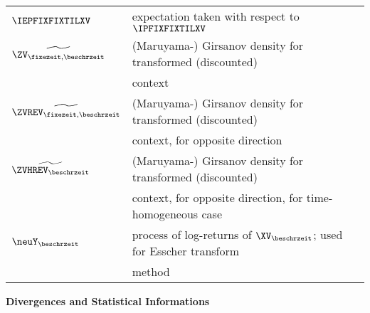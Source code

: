 \begin{longtable}{ll}
\\
\hspace{-0.33cm} $\IEPFIXFIXTILXV$ & expectation taken with respect to  $\IPFIXFIXTILXV$ 
\\
\hspace{-0.33cm} $\widetilde{\ZV_{{\fixezeit},{\beschrzeit}}}$ & (Maruyama-) Girsanov density 
 for transformed (discounted) 
\\
\hspace{-0.33cm} $\ $ & context
\\
\hspace{-0.33cm} $\widetilde{\ZVREV_{\fixezeit,\beschrzeit}}$ & (Maruyama-) Girsanov density  for  transformed (discounted)
\\
\hspace{-0.33cm} $\ $ &
 context, for opposite direction
\\
\hspace{-0.33cm} $\widetilde{\ZVHREV_{{\beschrzeit}}}$ & (Maruyama-) Girsanov density
for  transformed (discounted)  
\\
\hspace{-0.33cm} $\ $ & context, for opposite direction, for time-homogeneous case
\\
\hspace{-0.33cm} $\neuY_{\beschrzeit}$ & process of log-returns of $\XV_{\beschrzeit}$; used for Esscher transform 
\\
\hspace{-0.33cm} $\ $ & method
\\

\end{longtable}

\shakernewpage 


{\large \bf Divergences and Statistical Informations}


